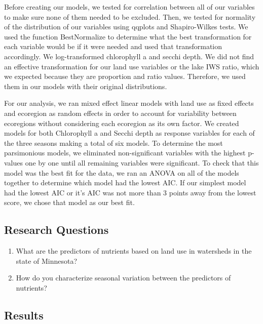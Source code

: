 \documentclass[12pt,]{article}
\begin{document}
Before creating our models, we tested for correlation between all of our
variables to make sure none of them needed to be excluded. Then, we
tested for normality of the distribution of our variables using qqplots
and Shapiro-Wilkes tests. We used the function BestNormalize to
determine what the best transformation for each variable would be if it
were needed and used that transformation accordingly. We log-transformed
chlorophyll a and secchi depth. We did not find an effective
transformation for our land use variables or the lake IWS ratio, which
we expected because they are proportion and ratio values. Therefore, we
used them in our models with their original distributions.

For our analysis, we ran mixed effect linear models with land use as
fixed effects and ecoregion as random effects in order to account for
variability between ecoregions without considering each ecoregion as its
own factor. We created models for both Chlorophyll a and Secchi depth as
response variables for each of the three seasons making a total of six
models. To determine the most parsimonious models, we eliminated
non-significant variables with the highest p-values one by one until all
remaining variables were significant. To check that this model was the
best fit for the data, we ran an ANOVA on all of the models together to
determine which model had the lowest AIC. If our simplest model had the
lowest AIC or it's AIC was not more than 3 points away from the lowest
score, we chose that model as our best fit.

\hypertarget{research-questions}{%
\subsection{Research Questions}\label{research-questions}}

\begin{enumerate}
\def\labelenumi{\arabic{enumi}.}
\item
  What are the predictors of nutrients based on land use in watersheds
  in the state of Minnesota?
\item
  How do you characterize seasonal variation between the predictors of
  nutrients?
\end{enumerate}

\hypertarget{results}{%
\subsection{Results}\label{results}}
\end{document}
